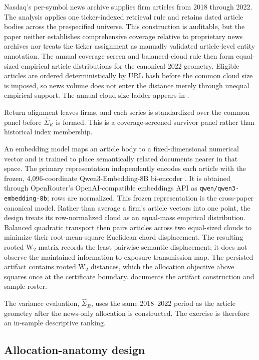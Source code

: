 Nasdaq's per-symbol news archive supplies firm articles from 2018 through 2022.
The analysis applies one ticker-indexed retrieval rule and retains dated article
bodies across the prespecified universe.
This construction is auditable, but the paper neither establishes comprehensive
coverage relative to proprietary news archives nor treats the ticker assignment
as manually validated article-level entity annotation.
The annual coverage screen and balanced-cloud rule then form equal-sized
empirical article distributions for the canonical 2022 geometry.
Eligible articles are ordered deterministically by URL hash before the common
cloud size is imposed, so news volume does not enter the distance merely through
unequal empirical support.
The annual cloud-size ladder appears in .

Return alignment leaves  firms, and each series is
standardized over the common panel before $\widehat\Sigma_R$ is formed.
This is a coverage-screened survivor panel rather than historical index
membership.

An embedding model maps an article body to a fixed-dimensional numerical vector
and is trained to place semantically related documents nearer in that space.
The primary representation independently encodes each article with the frozen,
4,096-coordinate Qwen3-Embedding-8B bi-encoder
\citep{qwen3_embedding_2025}.
It is obtained through OpenRouter's OpenAI-compatible embeddings API as
\texttt{qwen/qwen3-}\allowbreak\texttt{embedding-8b}; rows are normalized.
This frozen representation is the cross-paper canonical model.
Rather than average a firm's article vectors into one point, the design treats
its row-normalized cloud as an equal-mass empirical distribution.
Balanced quadratic transport then pairs articles across two equal-sized clouds
to minimize their root-mean-square Euclidean chord displacement.
The resulting rooted W$_2$ matrix records the least pairwise semantic
displacement; it does not observe the maintained information-to-exposure
transmission map.
The persisted artifact contains rooted W$_2$ distances, which the allocation
objective above squares once at the certificate boundary.
 documents the artifact construction and sample roster.

The variance evaluation, $\widehat\Sigma_R$, uses the same 2018--2022 period
as the article geometry after the news-only allocation is constructed.
The exercise is therefore an in-sample descriptive ranking.

\subsection{Allocation-anatomy design}
\label{sec:p3-anatomy-design}


